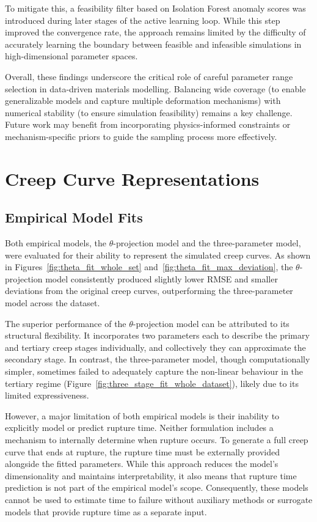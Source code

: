 \documentclass[class=scrbook, crop=false]{standalone}
\begin{document}
To mitigate this, a feasibility filter based on Isolation Forest anomaly scores was introduced during later stages of the active learning loop. While this step improved the convergence rate, the approach remains limited by the difficulty of accurately learning the boundary between feasible and infeasible simulations in high-dimensional parameter spaces.

Overall, these findings underscore the critical role of careful parameter range selection in data-driven materials modelling. Balancing wide coverage (to enable generalizable models and capture multiple deformation mechanisms) with numerical stability (to ensure simulation feasibility) remains a key challenge. Future work may benefit from incorporating physics-informed constraints or mechanism-specific priors to guide the sampling process more effectively.

\section{Creep Curve Representations}

\subsection{Empirical Model Fits}

Both empirical models, the $\theta$-projection model and the three-parameter model, were evaluated for their ability to represent the simulated creep curves. As shown in Figures~\ref{fig:theta_fit_whole_set} and~\ref{fig:theta_fit_max_deviation}, the $\theta$-projection model consistently produced slightly lower RMSE and smaller deviations from the original creep curves, outperforming the three-parameter model across the dataset.

The superior performance of the $\theta$-projection model can be attributed to its structural flexibility. It incorporates two parameters each to describe the primary and tertiary creep stages individually, and collectively they can approximate the secondary stage. In contrast, the three-parameter model, though computationally simpler, sometimes failed to adequately capture the non-linear behaviour in the tertiary regime (Figure~\ref{fig:three_stage_fit_whole_dataset}), likely due to its limited expressiveness.

However, a major limitation of both empirical models is their inability to explicitly model or predict rupture time. Neither formulation includes a mechanism to internally determine when rupture occurs. To generate a full creep curve that ends at rupture, the rupture time must be externally provided alongside the fitted parameters. While this approach reduces the model's dimensionality and maintains interpretability, it also means that rupture time prediction is not part of the empirical model's scope. Consequently, these models cannot be used to estimate time to failure without auxiliary methods or surrogate models that provide rupture time as a separate input.
\end{document}
